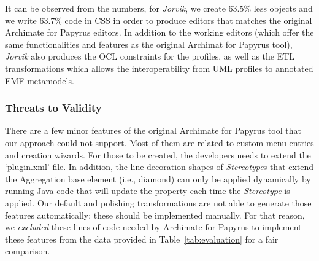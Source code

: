 It can be observed from the numbers, for \textit{Jorvik}, we create 63.5\% less objects and we write 63.7\% code in CSS in order to produce editors that matches the original Archimate for Papyrus editors.
In addition to the working editors (which offer the same functionalities and features as the original Archimat for Papyrus tool), \textit{Jorvik} also produces the OCL constraints for the profiles, as well as the ETL transformations which allows the interoperability from UML profiles to annotated EMF metamodels.


\subsubsection{Threats to Validity}
There are a few minor features of the original Archimate for Papyrus tool that our approach could not support. 
Most of them are related to custom menu entries and creation wizards. 
For those to be created, the developers needs to extend the `plugin.xml' file. 
In addition, the line decoration shapes of \textit{Stereotype}s that extend the Aggregation base element (i.e., diamond) can only be applied dynamically by running Java code that will update the property each time the \textit{Stereotype} is applied. 
Our default and polishing transformations are not able to generate those features automatically; these should be implemented manually. 
For that reason, we \textit{excluded} these lines of code needed by Archimate for Papyrus to implement these features from the data provided in Table~\ref{tab:evaluation} for a fair comparison. 

